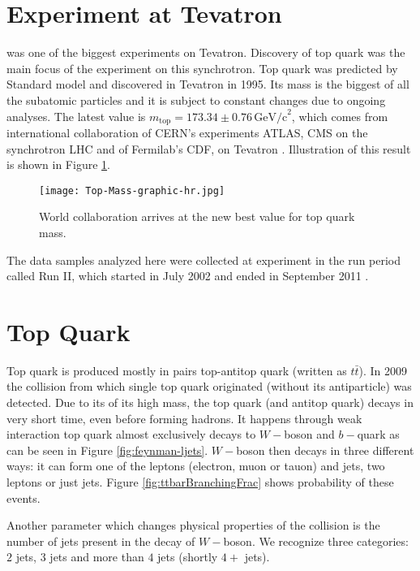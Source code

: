 \section{\texorpdfstring{\dzero}{D0} Experiment at Tevatron}
\dzero was one of the biggest experiments on Tevatron. Discovery of top quark was the main focus of the \dzero experiment on this synchrotron. Top quark was predicted by Standard model and discovered in Tevatron in 1995. Its mass is the biggest of all the subatomic particles and it is subject to constant changes due to ongoing analyses. The latest value is $m_\mathrm{top} = 173.34 \pm 0.76 \,\mathrm{GeV/c}^2 $, which comes from international collaboration of CERN's experiments ATLAS, CMS on the synchrotron LHC and of Fermilab's CDF, \dzero on Tevatron \cite{jointMass}. Illustration of this result is shown in Figure \ref{fig:jointMass}. 

\begin{figure}[h]
	\centering
	\texttt{[image: Top-Mass-graphic-hr.jpg]}
	\caption{World collaboration arrives at the new best value for top quark mass.}
	\label{fig:jointMass}
\end{figure}

The data samples analyzed here were collected at \dzero experiment in the run period called Run II, which started in July 2002 and ended in September 2011 \cite{Yuntse}.

\section{Top Quark} \label{sec:topQuark}
Top quark is produced mostly in pairs top-antitop quark (written as $t\bar{t}$). In 2009 the collision from which single top quark originated  (without its antiparticle) was detected. Due to its of its high mass, the top quark (and antitop quark) decays in very short time, even before forming hadrons. It happens through weak interaction top quark almost exclusively decays to $W-$boson and $b-$quark as can be seen in Figure \ref{fig:feynman-ljets}. $W-$boson then decays in three different ways: it can form one of the leptons (electron, muon or tauon) and jets, two leptons or just jets. Figure \ref{fig:ttbarBranchingFrac} shows probability of these events. 

Another parameter which changes physical properties of the collision is the number of jets present in the decay of $W-$boson. We recognize three categories: $2$ jets, $3$ jets and more than $4$ jets (shortly $4+$ jets).

